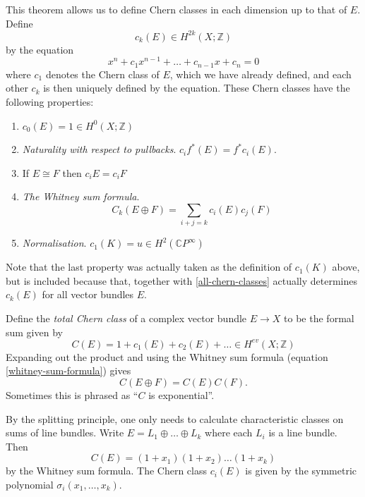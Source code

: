 \documentclass[a4paper,10pt]{article}
\theoremstyle{plain}%
\theoremstyle{definition}
\theoremstyle{remark}
\newcommand{\ZZ}{\mathbb{Z}}
\newcommand{\CC}{\mathbb{C}}
\newcommand{\cp}{\CC P}   %
\newcommand{\CPi}{\cp^\infty}
\begin{document}
This theorem allows us to define Chern classes in each dimension up to
that of $E$. Define
\begin{equation*}
  c_k(E) \in H^{2k}(X; \ZZ)
\end{equation*}
by the equation
\begin{equation}\label{all-chern-classes}
  x^n + c_1x^{n-1} + \dots + c_{n-1}x + c_n = 0
\end{equation}
where $c_1$ denotes the Chern class of $E$, which we have already
defined, and each other $c_k$ is then uniquely defined by the
equation. These Chern classes have the following properties:
\begin{enumerate}
\item $c_0(E) = 1 \in H^0(X;\ZZ)$

\item \emph{Naturality with respect to pullbacks}. $c_if^*(E) =
  f^*c_i(E)$.

\item If $E\cong F$ then $c_iE = c_iF$

\item \emph{The Whitney sum formula}.
  \begin{equation}\label{whitney-sum-formula}
    C_k(E\oplus F) = \sum_{i+j=k} c_i(E)c_j(F)
  \end{equation}

\item \emph{Normalisation}. $c_1(K) = u\in H^2(\CPi)$
\end{enumerate}
Note that the last property was actually taken as the definition of
$c_1(K)$ above, but is included because that, together with
\eqref{all-chern-classes} actually determines $c_k(E)$ for all vector
bundles $E$.

Define the \emph{total Chern class} of a complex vector bundle $E \to
X$ to be the formal sum given by
\begin{equation}
  \label{total-chern-class}
  C(E) = 1 + c_1(E) + c_2(E) + \dots \in H^{ev}(X; \ZZ)
\end{equation}
Expanding out the product and using the Whitney sum formula (equation
\eqref{whitney-sum-formula}) gives
\begin{equation*}
  C(E \oplus F) = C(E)C(F).
\end{equation*}
Sometimes this is phrased as ``$C$ is exponential''.

By the splitting principle, one only needs to calculate characteristic
classes on sums of line bundles. Write $E = L_1\oplus \dots \oplus
L_k$ where each $L_i$ is a line bundle. Then
\begin{equation*}
  C(E) = (1+x_1)(1+x_2)\dots (1+x_k)
\end{equation*}
by the Whitney sum formula. The Chern class $c_i(E)$ is given by the
symmetric polynomial $\sigma_i(x_1,\dots ,x_k)$.
\end{document}
